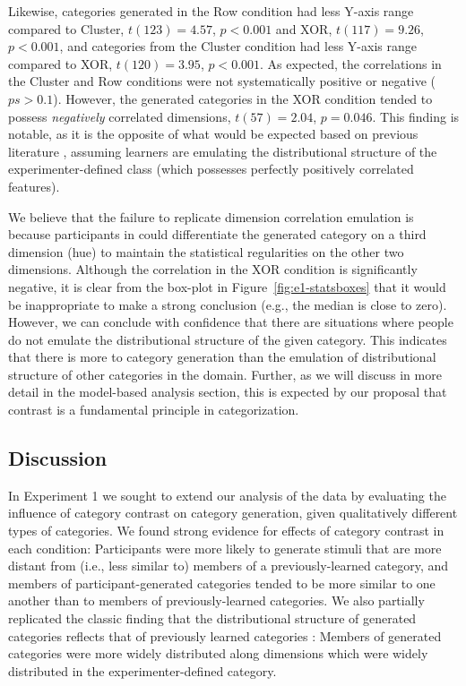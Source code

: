 \documentclass[12pt]{article}
\begin{document}
\begin{flushleft}
Likewise, categories generated in the Row condition had less Y-axis range
compared to Cluster, $t(123) = 4.57$, $p < 0.001$ and XOR, $t(117) = 9.26$, $p <
0.001$, and categories from the Cluster condition had less Y-axis range compared
to XOR, $t(120) = 3.95$, $p < 0.001$. As expected, the correlations in the
Cluster and Row conditions were not systematically positive or negative ($ps >
0.1$). However, the generated categories in the XOR condition tended to possess
{\em negatively} correlated dimensions, $t(57) = 2.04$, $p = 0.046$. This
finding is notable, as it is the opposite of what would be expected based on previous literature \citep{jern2013probabilistic}, assuming
learners are emulating the distributional structure of the experimenter-defined
class (which possesses perfectly positively correlated features).

We believe that the failure to replicate dimension correlation emulation is because participants in
\cite{jern2013probabilistic} could differentiate the generated category on a
third dimension (hue) to maintain the statistical regularities on the other two
dimensions. Although the correlation in the XOR condition is significantly
negative, it is clear from the box-plot in Figure~\ref{fig:e1-statsboxes} that
it would be inappropriate to make a strong conclusion (e.g., the median is close
to zero). However, we can conclude with confidence that there are situations
where people do not emulate the distributional structure of the given category.
This indicates that there is more to category generation than the emulation of
distributional structure of other categories in the domain. Further, as we will
discuss in more detail in the model-based analysis section, this is expected by
our proposal that contrast is a fundamental principle in categorization.


\subsection{Discussion} In Experiment 1 we sought to extend our analysis of the
\cite{jern2013probabilistic} data by evaluating the influence of category
contrast on category generation, given qualitatively different types of categories. We found strong evidence for effects of category contrast in each
condition: Participants were more likely to generate stimuli that are more
distant from (i.e., less similar to) members of a previously-learned category,
and members of participant-generated categories tended to be more similar to one
another than to members of previously-learned categories. We also partially
replicated the classic finding that the distributional structure of generated
categories reflects that of previously learned categories
\citep{jern2013probabilistic,ward1994structured}: Members of generated
categories were more widely distributed along dimensions which were widely
distributed in the experimenter-defined category.


\end{flushleft}
\end{document}
